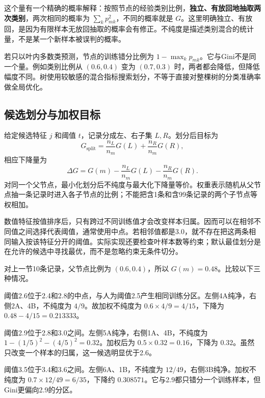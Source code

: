 这个量有一个精确的概率解释：按照节点的经验类别比例，\textbf{独立、有放回地抽取两次类别}，两次相同的概率为 $\sum_kp_{mk}^{2}$，不同的概率就是 $G$。这里明确独立、有放回，是因为有限样本无放回抽取的概率会有修正。不纯度是描述类别混合的统计量，不是某一个新样本被误判的概率。

若只以叶内多数类预测，节点的训练错分比例为 $1-\max_kp_{mk}$。它与Gini不是同一个量。例如类别比例从 $(0.6,0.4)$ 变为 $(0.7,0.3)$ 时，两者都会降低，但降低幅度不同。树使用较敏感的混合指标搜索划分，不等于直接对整棵树的分类准确率做全局优化。

\subsection{候选划分与加权目标}
给定候选特征 $j$ 和阈值 $t$，记录分成左、右子集 $L,R$。划分后目标为
\[
G_{\mathrm{split}}=\frac{n_L}{n_m}G(L)+\frac{n_R}{n_m}G(R),
\]
相应下降量为
\begin{equation}
\Delta G=G(m)-\frac{n_L}{n_m}G(L)-\frac{n_R}{n_m}G(R).
\label{eq:tree-gain}
\end{equation}
对同一个父节点，最小化划分后不纯度与最大化下降量等价。权重表示随机从父节点抽一条记录时进入各子节点的比例；不能把含1条和含99条记录的两个子节点等权相加。

数值特征按值排序后，只有跨过不同训练值才会改变样本归属。因而可以在相邻不同值之间选择代表阈值，通常使用中点。若相邻值都是3.0，就不存在把这两条相同输入按该特征分开的阈值。实际实现还要检查叶样本数等约束；默认最佳划分是在允许的候选中寻找最优，而不是忽略约束无条件切分。

对上一节10条记录，父节点比例为 $(0.6,0.4)$，所以 $G(m)=0.48$。比较以下三种情况。

阈值2.6位于2.4和2.8的中点，与人为阈值2.5产生相同训练分区。左侧4A纯净，右侧2A、4B，不纯度为 $4/9$。故加权不纯度为 $0.6\times4/9=4/15$，下降为 $0.48-4/15=0.213333$。

阈值2.9位于2.8和3.0之间。左侧5A纯净，右侧1A、4B，不纯度为 $1-(1/5)^2-(4/5)^2=0.32$。加权后为 $0.5\times0.32=0.16$，下降为 $0.32$。虽然只改变一个样本的归属，这一候选明显优于2.6。

阈值3.5位于3.4和3.6之间。左侧6A、1B，不纯度为 $12/49$，右侧3B纯净。加权不纯度为 $0.7\times12/49=6/35$，下降约 $0.308571$。它与2.9都只错分一个训练样本，但Gini更偏向2.9的分区。


